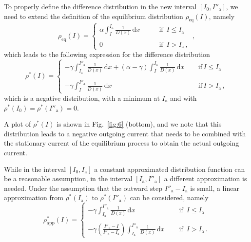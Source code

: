 To properly define the difference distribution in the new interval $[I_0, I''_\mathrm{a}]$, we need to extend the definition of the equilibrium distribution $\rho_\text{eq}(I)$, namely
\begin{equation}
    \rho_\text{eq}(I) = 
    \left\{\begin{array}{lr}
        \alpha \displaystyle{\int_I^{I_\mathrm{a}} \frac{1}{D(x)}\,\mathrm{d}x} \qquad & \text{if } \, I \leq I_\mathrm{a} \\
        \\
        0 \qquad & \text{if } \, I > I_\mathrm{a}\,,
    \end{array}\right.\,,
\end{equation}
which leads to the following expression for the difference distribution  
\begin{equation}
    \rho^\ast(I) = 
    \left\{\begin{array}{lr}
        - \gamma \displaystyle{\int_{I_\mathrm{a}}^{I''_\mathrm{a}} \frac{1}{D(x)}\,\mathrm{d}x + (\alpha - \gamma) \int_{I}^{I_\mathrm{a}} \frac{1}{D(x)}\,\mathrm{d}x}\ \quad &\text{if} \, I \leq I_\mathrm{a}\\
        \\
        - \gamma \displaystyle{\int_{I}^{I''_\mathrm{a}} \frac{1}{D(x)}\,\mathrm{d}x} \quad &\text{if} \, I > I_\mathrm{a}\,,
    \end{array}\right. 
    \label{eq:outward_difference}
\end{equation}
which is a negative distribution, with a minimum at $I_\mathrm{a}$ and with $\rho^\ast(I_0) = \rho^\ast(I''_\mathrm{a}) = 0$.

A plot of $\rho^\ast(I)$ is shown in Fig.~\ref{fig:6} (bottom), and we note that this distribution leads to a negative outgoing current that needs to be combined with the stationary current of the equilibrium process to obtain the actual outgoing current.

While in the interval $[I_0, I_\mathrm{a}]$ a constant approximated distribution function can be a reasonable assumption, in the interval $[I_\mathrm{a}, I''_\mathrm{a}]$ a different approximation is needed. Under the assumption that the outward step $I''_\mathrm{a} - I_\mathrm{a}$ is small, a linear approximation from $\rho^\ast(I_\mathrm{a})$ to $\rho^\ast(I''_\mathrm{a})$ can be considered, namely
\begin{equation}
    \rho^\ast_\text{app}(I) = 
    \left\{\begin{array}{lr}
        - \gamma \displaystyle{\int_{I_\mathrm{a}}^{I''_\mathrm{a}} \frac{1}{D(x)}\,\mathrm{d}x} \quad &\text{  if } \, I \leq I_\mathrm{a}\\
        \\
        - \gamma \displaystyle{\left(\frac{I''_\mathrm{a} - I}{I''_\mathrm{a} - I_\mathrm{a}} \right)} \displaystyle{\int_{I_\mathrm{a}}^{I''_\mathrm{a}} \frac{1}{D(x)}\,\mathrm{d}x} \quad &\text{  if } \, I > I_\mathrm{a} \,.
    \end{array}\right. 
    \label{eq:outward_difference_approx}
\end{equation} 


